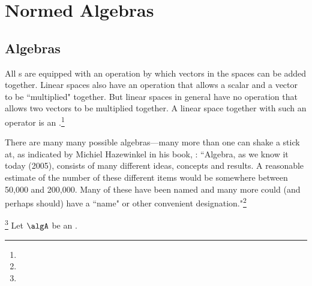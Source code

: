 
\chapter{Normed Algebras}
\section{Algebras}

All s are equipped with an operation by which vectors in the spaces can be added together.
Linear spaces also have an operation that allows a scalar and a vector to be ``multiplied" together.
But linear spaces in general have no operation that allows two vectors to be multiplied together.
A linear space together with such an operator is an .\footnote{}

There are many many possible algebras---many more than one can shake a stick at,
as indicated by Michiel Hazewinkel in his book, :
``Algebra, as we know it today (2005), 
consists of many different ideas, concepts and results. 
A reasonable estimate of the number of these different items 
would be somewhere between 50,000 and 200,000. 
Many of these have been named and many more could (and perhaps should) 
have a ``name" or other convenient designation."\footnote{}

\begin{definition}
\footnote{
  }
\label{def:unital_algebra}
\label{def:ualg}
Let $\algA$ be an .
\end{definition}

